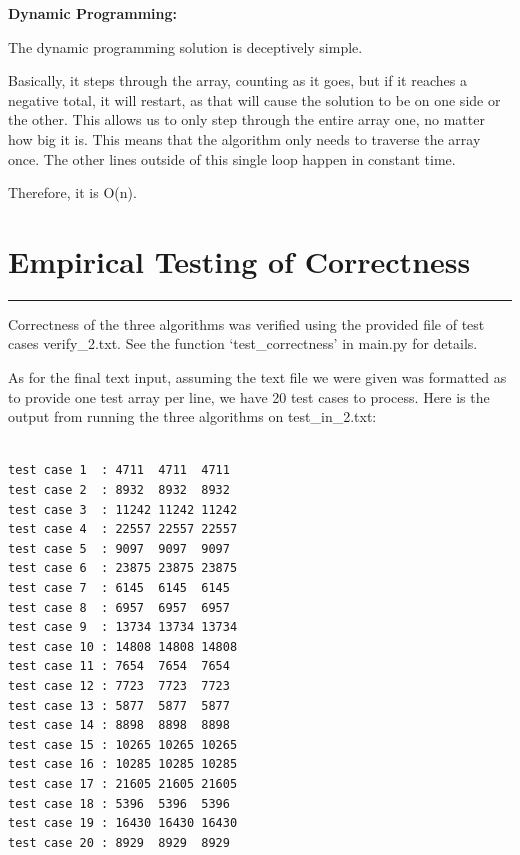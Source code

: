 \documentclass[letterpaper,10pt,titlepage,fleqn]{article}
\begin{document}
\begin{centering}
\textbf{Dynamic Programming:}
\end{centering}


The dynamic programming solution is deceptively simple.

Basically, it steps through the array, counting as it goes, but if it reaches a negative total, it will restart, as that will cause the solution to be on one side or the other.
This allows us to only step through the entire array one, no matter how big it is. This means that the algorithm only needs to traverse the array once. The other lines outside of this single loop happen in constant time. 

Therefore, it is O(n).

\section*{Empirical Testing of Correctness}
\hrule

Correctness of the three algorithms was verified using the provided file of test cases verify\_2.txt. See the function `test\_correctness' in main.py for details. 

As for the final text input, assuming the text file we were given was formatted as to provide one test array per line, we have 20 test cases to process. Here is the output from running the three algorithms on test\_in\_2.txt:

\begin{lstlisting}

test case 1  : 4711  4711  4711
test case 2  : 8932  8932  8932
test case 3  : 11242 11242 11242
test case 4  : 22557 22557 22557
test case 5  : 9097  9097  9097
test case 6  : 23875 23875 23875
test case 7  : 6145  6145  6145
test case 8  : 6957  6957  6957
test case 9  : 13734 13734 13734
test case 10 : 14808 14808 14808
test case 11 : 7654  7654  7654
test case 12 : 7723  7723  7723
test case 13 : 5877  5877  5877
test case 14 : 8898  8898  8898
test case 15 : 10265 10265 10265
test case 16 : 10285 10285 10285
test case 17 : 21605 21605 21605
test case 18 : 5396  5396  5396
test case 19 : 16430 16430 16430
test case 20 : 8929  8929  8929

\end{lstlisting}

\newpage
\end{document}
